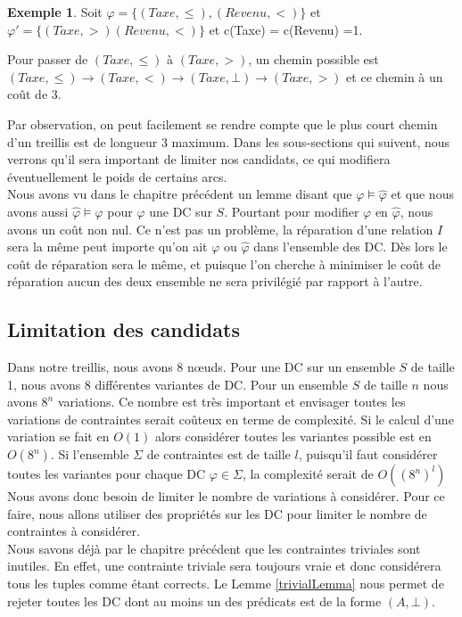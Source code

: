 \documentclass[letterpaper, 12pt]{report}
\theoremstyle{definition}
\newtheorem{myexample}{Exemple}
\begin{document}
\begin{myexample}
	Soit $\varphi = \{(Taxe,\leq),(Revenu,<) \}$ et $\varphi' = \{(Taxe,>)(Revenu,<) \}$ et c(Taxe) = c(Revenu) =1.
	
	Pour passer de $(Taxe,\leq)$ à $(Taxe,>)$, un chemin possible est $(Taxe,\leq) \rightarrow (Taxe,<) \rightarrow (Taxe,\bot) \rightarrow (Taxe,>)$ et ce chemin à un coût de 3.
\end{myexample}

Par observation, on peut facilement se rendre compte que le plus court chemin d'un treillis est de longueur 3 maximum. Dans les sous-sections qui suivent, nous verrons qu'il sera important de limiter nos candidats, ce qui modifiera éventuellement le poids de certains arcs.\\

Nous avons vu dans le chapitre précédent un lemme disant que $\varphi \models \hat{\varphi}$ et que nous avons aussi $\hat{\varphi} \models \varphi$ pour $\varphi$ une DC sur $S$. Pourtant pour modifier $\varphi$ en $\hat{\varphi}$, nous avons un coût non nul. Ce n'est pas un problème, la réparation d'une relation $I$ sera la même peut importe qu'on ait $\varphi$ ou $\hat{\varphi}$ dans l'ensemble des DC. Dès lors le coût de réparation sera le même, et puisque l'on cherche à minimiser le coût de réparation aucun des deux ensemble ne sera privilégié par rapport à l'autre.

\subsection{Limitation des candidats}

Dans notre treillis, nous avons 8 nœuds. Pour une DC sur un ensemble $S$ de taille 1, nous avons 8 différentes variantes de DC. Pour un ensemble $S$ de taille $n$ nous avons $8^n$ variations. Ce nombre est très important et envisager toutes les variations de contraintes serait coûteux en terme de complexité. Si le calcul d'une variation se fait en $O(1)$ alors considérer toutes les variantes possible est en $O(8^n)$. Si l'ensemble $\Sigma$ de contraintes est de taille $l$, puisqu'il faut considérer toutes les variantes pour chaque DC $\varphi \in \Sigma$, la complexité serait de $O((8^n)^l)$ Nous avons donc besoin de limiter le nombre de variations à considérer. Pour ce faire, nous allons utiliser des propriétés sur les DC pour limiter le nombre de contraintes à considérer.\\

Nous savons déjà par le chapitre précédent que les contraintes triviales sont inutiles. En effet, une contrainte triviale sera toujours vraie et donc considérera tous les tuples comme étant corrects. Le Lemme \ref{trivialLemma} nous permet de rejeter toutes les DC dont au moins un des prédicats est de la forme $(A,\bot)$.\\
\end{document}
